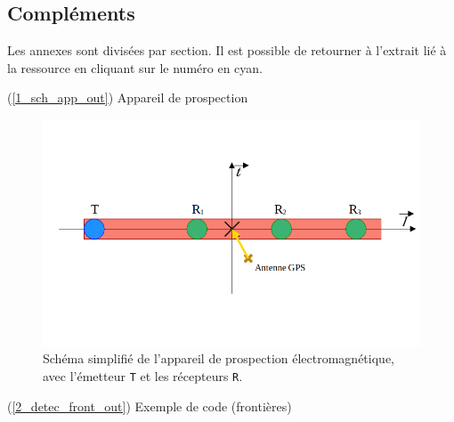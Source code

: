 \documentclass[12pt]{article}
\begin{document}
\subsection{Compléments}

    Les annexes sont divisées par section. Il est possible de retourner à l'extrait lié à la ressource en cliquant sur le numéro en cyan.

    \label{1_sch_app_in} (\ref{1_sch_app_out}) Appareil de prospection

    \begin{figure}[ht!]
        \centering
        \includegraphics[width=\textwidth]{Images/SepVoies_Sch1.png}  
        \caption{Schéma simplifié de l'appareil de prospection électromagnétique, avec l'émetteur \texttt{T} et les récepteurs \texttt{R}.}
    \end{figure}

\newpage
    \label{2_detec_front_in} (\ref{2_detec_front_out}) Exemple de code (frontières)
    
\end{document}
